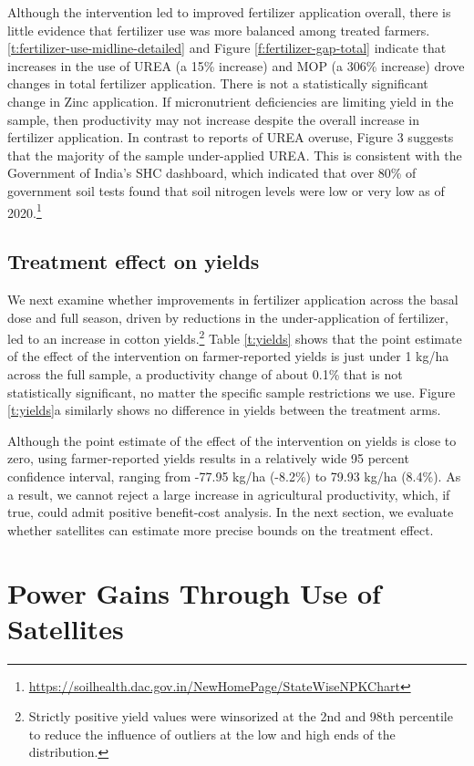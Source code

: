 \documentclass{article}
\begin{document}
Although the intervention led to improved fertilizer application overall, there is little evidence that fertilizer use was more balanced among treated farmers. \ref{t:fertilizer-use-midline-detailed} and Figure \ref{f:fertilizer-gap-total} indicate that increases in the use of UREA (a 15\% increase) and MOP (a 306\% increase) drove changes in total fertilizer application. There is not a statistically significant change in Zinc application. If micronutrient deficiencies are limiting yield in the sample, then productivity may not increase despite the overall increase in fertilizer application. In contrast to reports of UREA overuse, Figure 3 suggests that the majority of the sample under-applied UREA. This is consistent with the Government of India’s SHC dashboard, which indicated that over 80\% of government soil tests found that soil nitrogen levels were low or very low as of 2020.\footnote{\url{https://soilhealth.dac.gov.in/NewHomePage/StateWiseNPKChart}}

\subsection{Treatment effect on yields} \label{section:yields}

We next examine whether improvements in fertilizer application across the basal dose and full season, driven by reductions in the under-application of fertilizer, led to an increase in cotton yields.\footnote{Strictly positive yield values were winsorized at the 2nd and 98th percentile to reduce the influence of outliers at the low and high ends of the distribution.} Table \ref{t:yields} shows that the point estimate of the effect of the intervention on farmer-reported yields is just under 1 kg/ha across the full sample, a productivity change of about 0.1\% that is not statistically significant, no matter the specific sample restrictions we use. Figure \ref{t:yields}a similarly shows no difference in yields between the treatment arms. 

Although the point estimate of the effect of the intervention on yields is close to zero, using farmer-reported yields results in a relatively wide 95 percent confidence interval, ranging from -77.95 kg/ha (-8.2\%) to 79.93 kg/ha (8.4\%). As a result, we cannot reject a large increase in agricultural productivity, which, if true, could admit positive benefit-cost analysis. In the next section, we evaluate whether satellites can estimate more precise bounds on the treatment effect.   

\section{Power Gains Through Use of Satellites}
\end{document}
